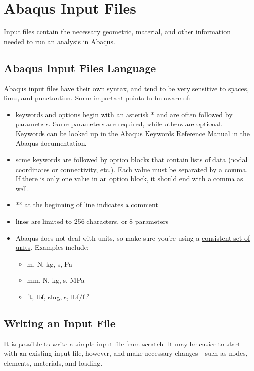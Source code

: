 \documentclass[10pt,letterpaper,oneside]{report}
\begin{document}
\section{Abaqus Input Files}
Input files contain the necessary geometric, material, and other information needed to run an analysis in Abaqus.  

\subsection{Abaqus Input Files Language}
Abaqus input files have their own syntax, and tend to be very sensitive to spaces, lines, and punctuation.  Some important points to be aware of: 
\begin{itemize}
\item keywords and options begin with an asterisk * and are often followed by parameters.  Some parameters are required, while others are optional.  Keywords can be looked up in the Abaqus Keywords Reference Manual in the Abaqus documentation.  
\item some keywords are followed by option blocks that contain lists of data (nodal coordinates or connectivity, etc.).  Each value must be separated by a comma.  If there is only one value in an option block, it should end with a comma as well.  
\item ** at the beginning of line indicates a comment
\item lines are limited to 256 characters, or 8 parameters
\item Abaqus does not deal with units, so make sure you're using a \href{https://caeai.com/blog/tips-tricks-consistent-fea-units}{consistent set of units}.  Examples include: 
  \begin{itemize}
  \item m, N, kg, s, Pa
  \item mm, N, kg, s, MPa
  \item ft, lbf, slug, s, lbf/ft$^2$
  \end{itemize}
\end{itemize}

\subsection{Writing an Input File}
It is possible to write a simple input file from scratch.  It may be easier to start with an existing input file, however, and make necessary changes - such as nodes, elements, materials, and loading.
\end{document}
